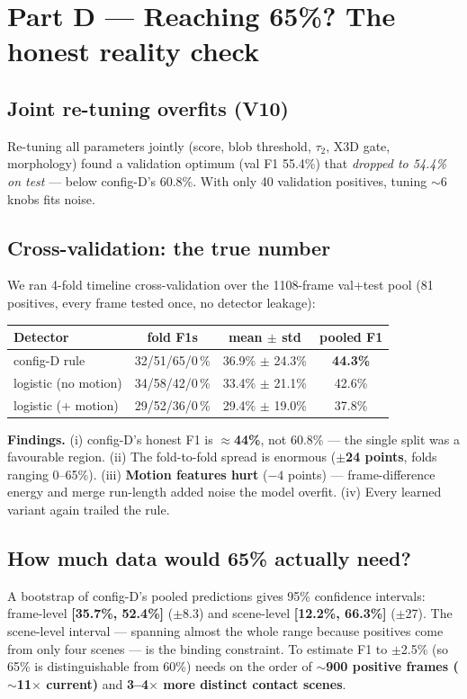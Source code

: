 \documentclass[11pt, a4paper]{article}
\begin{document}
\section{Part D — Reaching 65\%? The honest reality check}
\label{sec:cv}

\subsection{Joint re-tuning overfits (V10)}
Re-tuning all parameters jointly (score, blob threshold, $\tau_2$, X3D gate,
morphology) found a validation optimum (val F1 55.4\%) that \emph{dropped to
54.4\% on test} --- below config-D's 60.8\%. With only 40 validation positives,
tuning $\sim$6 knobs fits noise.

\subsection{Cross-validation: the true number}
We ran 4-fold timeline cross-validation over the 1108-frame val+test pool (81
positives, every frame tested once, no detector leakage):

\begin{center}\renewcommand{\arraystretch}{1.15}
\begin{tabular}{l c c c}
\toprule
\textbf{Detector} & \textbf{fold F1s} & \textbf{mean $\pm$ std} & \textbf{pooled F1} \\
\midrule
config-D rule        & 32/51/65/0\,\% & 36.9\% $\pm$ 24.3\% & \textbf{44.3\%} \\
logistic (no motion) & 34/58/42/0\,\% & 33.4\% $\pm$ 21.1\% & 42.6\% \\
logistic (+ motion)  & 29/52/36/0\,\% & 29.4\% $\pm$ 19.0\% & 37.8\% \\
\bottomrule
\end{tabular}\end{center}

\textbf{Findings.} (i) config-D's honest F1 is $\approx$\textbf{44\%}, not 60.8\%
--- the single split was a favourable region. (ii) The fold-to-fold spread is
enormous (\textbf{$\pm$24 points}, folds ranging 0--65\%). (iii) \textbf{Motion
features hurt} ($-4$ points) --- frame-difference energy and merge run-length
added noise the model overfit. (iv) Every learned variant again trailed the rule.

\subsection{How much data would 65\% actually need?}
A bootstrap of config-D's pooled predictions gives 95\% confidence intervals:
frame-level \textbf{[35.7\%, 52.4\%]} ($\pm$8.3) and scene-level
\textbf{[12.2\%, 66.3\%]} ($\pm$27). The scene-level interval --- spanning almost
the whole range because positives come from only four scenes --- is the binding
constraint. To estimate F1 to $\pm$2.5\% (so 65\% is distinguishable from 60\%)
needs on the order of \textbf{$\sim$900 positive frames ($\sim$11$\times$ current)}
and \textbf{3--4$\times$ more distinct contact scenes}.
\end{document}
